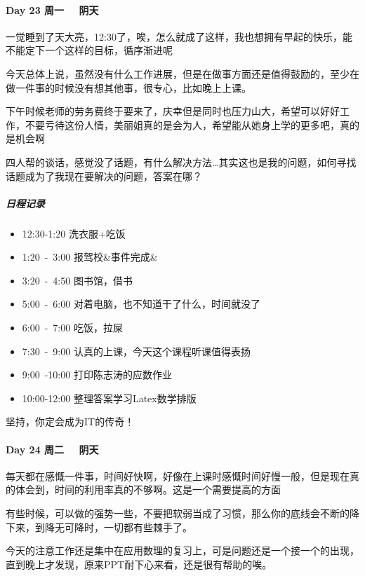 \documentclass[UTF8,a4paper,8pt]{ctexart}
\begin{document}
 	    \paragraph{Day 23  周一 \  \ 阴天}
 		    一觉睡到了天大亮，12:30了，唉，怎么就成了这样，我也想拥有早起的快乐，能不能定下一个这样的目标，循序渐进呢
 		    
 		    今天总体上说，虽然没有什么工作进展，但是在做事方面还是值得鼓励的，至少在做一件事的时候没有想其他事，很专心，比如晚上上课。
 		    
 		    下午时候老师的劳务费终于要来了，庆幸但是同时也压力山大，希望可以好好工作，不要亏待这份人情，美丽姐真的是会为人，希望能从她身上学的更多吧，真的是机会啊
 		    
 		    四人帮的谈话，感觉没了话题，有什么解决方法\dots	其实这也是我的问题，如何寻找话题成为了我现在要解决的问题，答案在哪？	    
 		    
 		    \subparagraph{日程记录}
 		    \begin{itemize}[fullwidth,itemindent=2em]
 		    	\item 12:30-1:20  洗衣服+吃饭  
 		        \item 1:20\ -\ 3:00  报驾校\&事件完成\&
 		        \item 3:20\ -\ 4:50  图书馆，借书
 		        \item 5:00\ -\ 6:00  对着电脑，也不知道干了什么，时间就没了
 		        \item 6:00\ -\ 7:00  吃饭，拉屎
 		        \item 7:30\ -\ 9:00  认真的上课，今天这个课程听课值得表扬
 		        \item 9:00\ -10:00 打印陈志涛的应数作业
 		        \item 10:00-12:00 整理答案学习Latex数学排版
 		    \end{itemize} 	
 		    
                 坚持，你定会成为IT的传奇！
 		  
 	  \paragraph{Day 24  周二 \  \ 阴天}
 		   每天都在感慨一件事，时间好快啊，好像在上课时感慨时间好慢一般，但是现在真的体会到，时间的利用率真的不够啊。这是一个需要提高的方面~
 		   
 		   有些时候，可以做的强势一些，不要把软弱当成了习惯，那么你的底线会不断的降下来，到降无可降时，一切都有些棘手了。
 		   
 		   今天的注意工作还是集中在应用数理的复习上，可是问题还是一个接一个的出现，直到晚上才发现，原来PPT耐下心来看，还是很有帮助的唉。
 		   
\end{document}

